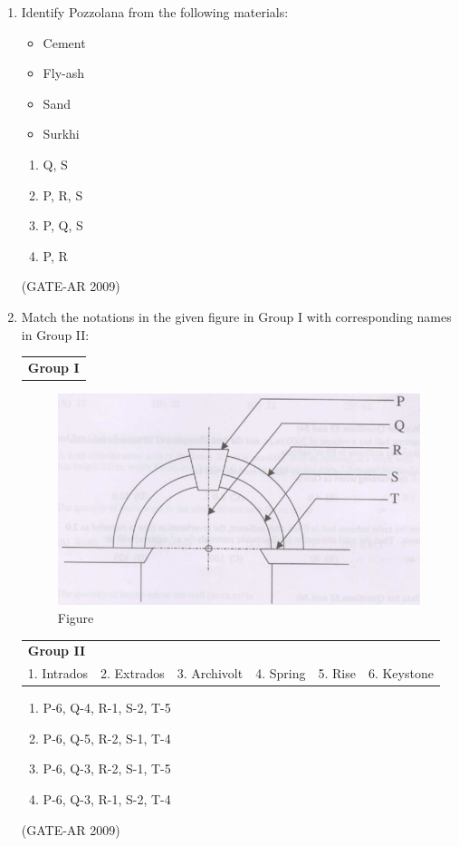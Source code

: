 \documentclass[a4paper,10pt]{article}
\begin{document}
\begin{enumerate}
    \item Identify Pozzolana from the following materials: 
    \begin{itemize}
        \item Cement
        \item Fly-ash
        \item Sand
        \item Surkhi
    \end{itemize}
    \begin{multicols}{2}
	\begin{enumerate}
        \item Q, S
        \item P, R, S
        \item P, Q, S
        \item P, R
    \end{enumerate}
	\end{multicols}
    \hfill (GATE-AR 2009)

	\item Match the notations in the given figure in Group I with corresponding names in Group II:  \\
    \begin{tabular}{ l }
	\textbf{Group I} \\
	\end{tabular}
	\begin{figure}[h!]
        \centering
        \includegraphics[width=0.5\columnwidth]{figs/4.png}
	\caption{Figure}
	\label{fig:Img04}
	\end{figure}
    \begin{tabular}{ l l l l l l }
	\textbf{Group II} & & & & & \\
	1. Intrados & 2. Extrados & 3. Archivolt & 4. Spring & 5. Rise & 6. Keystone \\
	\end{tabular}	
	\begin{enumerate}
        \item P-6, Q-4, R-1, S-2, T-5
        \item P-6, Q-5, R-2, S-1, T-4
        \item P-6, Q-3, R-2, S-1, T-5
        \item P-6, Q-3, R-1, S-2, T-4
    \end{enumerate}
    \hfill (GATE-AR 2009)


\end{enumerate}
\end{document}
